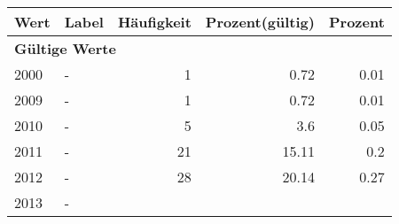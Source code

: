      \begin{longtable}{lXrrr}
     \toprule
     \textbf{Wert} & \textbf{Label} & \textbf{Häufigkeit} & \textbf{Prozent(gültig)} & \textbf{Prozent} \\
     \endhead
     \midrule
     \multicolumn{5}{l}{\textbf{Gültige Werte}}\\

     2000 &
     \multicolumn{1}{X}{ -  } &


       \num{1} &
       \num[round-mode=places,round-precision=2]{0,72} &
         \num[round-mode=places,round-precision=2]{0,01} \\

     2009 &
     \multicolumn{1}{X}{ -  } &


       \num{1} &
       \num[round-mode=places,round-precision=2]{0,72} &
         \num[round-mode=places,round-precision=2]{0,01} \\

     2010 &
     \multicolumn{1}{X}{ -  } &


       \num{5} &
       \num[round-mode=places,round-precision=2]{3,6} &
         \num[round-mode=places,round-precision=2]{0,05} \\

     2011 &
     \multicolumn{1}{X}{ -  } &


       \num{21} &
       \num[round-mode=places,round-precision=2]{15,11} &
         \num[round-mode=places,round-precision=2]{0,2} \\

     2012 &
     \multicolumn{1}{X}{ -  } &


       \num{28} &
       \num[round-mode=places,round-precision=2]{20,14} &
         \num[round-mode=places,round-precision=2]{0,27} \\

     2013 &
     \multicolumn{1}{X}{ -  } &



\end{longtable}
